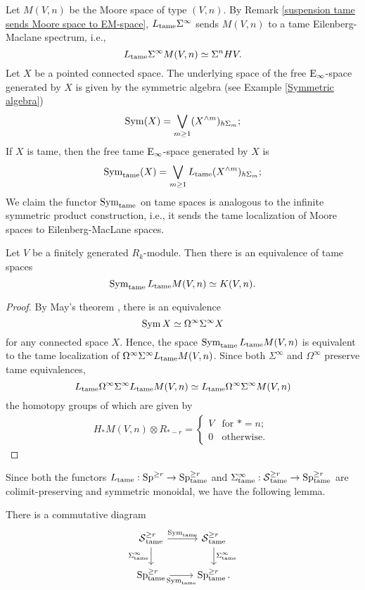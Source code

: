 Let $M(V,n)$ be the Moore space of type $(V,n)$.
By Remark \ref{suspension tame sends Moore space to EM-space}, $L_{\operatorname{\operatorname{tame}}}\Sigma^{\infty}$ sends $M(V,n)$ to a tame Eilenberg-Maclane spectrum, i.e., 
$$
L_{\operatorname{\operatorname{tame}}}\Sigma^{\infty} M(V,n) \simeq  \Sigma^n H V.
$$
Let $X$ be a pointed connected space. The underlying space of the
free $\operatorname{E}_{\infty}$-space generated by $X$ is given by the symmetric algebra (see Example \ref{Symmetric algebra})
\[
\operatorname{Sym}(X) = \bigvee_{m\geq 1} (X^{\wedge m})_{h\Sigma_m};
\]
If $X$ is tame, then the free tame $\operatorname{E}_{\infty}$-space generated by $X$ is 
\[
\operatorname{Sym}_{\operatorname{\operatorname{tame}}}(X) = \bigvee_{m\geq 1} L_{\operatorname{\operatorname{tame}}}(X^{\wedge m})_{h\Sigma_m};
\]
We claim the functor $\operatorname{Sym}_{\operatorname{\operatorname{tame}}}$ on tame spaces is analogous to the infinite symmetric product construction, i.e., it sends the tame localization of Moore spaces to Eilenberg-MacLane spaces.
\begin{lemma}
\label{Lemma 4.1.2.}
	Let $V$ be a finitely generated $R_k$-module.
	Then there is an equivalence of tame spaces
	$$
	 \operatorname{Sym}_{\operatorname{\operatorname{tame}}} L_{\operatorname{\operatorname{tame}}}M(V, n)\simeq K(V, n).
	$$
\end{lemma}
\begin{proof}
	By May's theorem \cite[6.3]{May_Iterated_Loop_Spaces}, there is an equivalence 
	$$
	\operatorname{Sym} X \simeq \Omega^{\infty}\Sigma^{\infty} X
	$$
	for any connected space $X$.
	Hence, the space $\operatorname{Sym}_{\operatorname{\operatorname{tame}}} L_{\operatorname{\operatorname{tame}}} M(V,n)$ is equivalent to the tame localization of $\Omega^{\infty}\Sigma^{\infty} L_{\operatorname{\operatorname{tame}}}M(V, n)$.
	Since both $\Sigma^{\infty}$ and $\Omega^{\infty}$ preserve tame equivalences,
	$$
	L_{\operatorname{\operatorname{tame}}}\Omega^{\infty}\Sigma^{\infty} L_{\operatorname{\operatorname{tame}}}M(V, n) 
	\simeq 
	L_{\operatorname{\operatorname{tame}}}\Omega^{\infty}\Sigma^{\infty}M(V, n) 
	$$
	the homotopy groups of which are given by 
	\begin{align*}
		H_* M(V, n)\otimes R_{*-r}= \begin{cases}
			V & \text{for } * = n;\\
			0 & \text{otherwise. }
		\end{cases}
	\end{align*}
\end{proof}

Since both the functors $L_{\operatorname{\operatorname{tame}}}:\operatorname{Sp}^{\geq r}\to \operatorname{Sp}^{\geq r}_{\operatorname{\operatorname{tame}}}$ and $\Sigma^{\infty}_{\operatorname{\operatorname{tame}}}:\operatorname{\mathcal{S}}^{\geq r}_{\operatorname{\operatorname{tame}}}\to \operatorname{Sp}^{\geq r}_{\operatorname{\operatorname{tame}}}$ are colimit-preserving and symmetric monoidal, we have the following lemma.
\begin{lemma}
\label{Sym commutes with Sigma infinity}
There is a commutative diagram
\[
\begin{tikzcd}
    	\Space^{\geq r}_{\tame} & \Space^{\geq r}_{\tame}\\
	\Sp_{\tame}^{\geq r} & \Sp_{\tame}^{\geq r}.
	\arrow[from=1-1, to= 1-2, "\Sym_{\tame}"]
	\arrow[from=1-1, to=2-1, "\Sigma_{\tame}^{\infty}" left]
	\arrow[from=1-2, to=2-2, "\Sigma_{\tame}^{\infty}"]
	\arrow[from=2-1, to= 2-2, "\Sym_{\tame}" below]
\end{tikzcd}
\]
\end{lemma}

